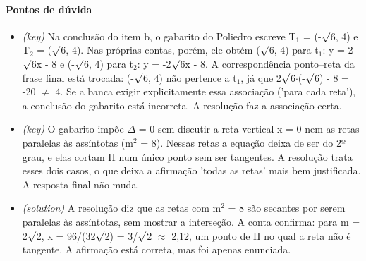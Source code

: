\documentclass{article}%
\begin{document}
\paragraph{Pontos de dúvida}%
\begin{itemize}%
\item%
\textit{(key)} Na conclusão do item b, o gabarito do Poliedro escreve T$_{1}$ = (-$\surd$6, 4) e T$_{2}$ = ($\surd$6, 4). Nas próprias contas, porém, ele obtém ($\surd$6, 4) para t$_{1}$: y = 2$\surd$6x - 8 e (-$\surd$6, 4) para t$_{2}$: y = -2$\surd$6x - 8. A correspondência ponto--reta da frase final está trocada: (-$\surd$6, 4) não pertence a t$_{1}$, já que 2$\surd$6$\cdot$(-$\surd$6) - 8 = -20 $\neq$ 4. Se a banca exigir explicitamente essa associação ('para cada reta'), a conclusão do gabarito está incorreta. A resolução faz a associação certa.%
\item%
\textit{(key)} O gabarito impõe $\Delta$ = 0 sem discutir a reta vertical x = 0 nem as retas paralelas às assíntotas (m$^2$ = 8). Nessas retas a equação deixa de ser do 2º grau, e elas cortam H num único ponto sem ser tangentes. A resolução trata esses dois casos, o que deixa a afirmação 'todas as retas' mais bem justificada. A resposta final não muda.%
\item%
\textit{(solution)} A resolução diz que as retas com m$^2$ = 8 são secantes por serem paralelas às assíntotas, sem mostrar a interseção. A conta confirma: para m = 2$\surd$2, x = 96/(32$\surd$2) = 3/$\surd$2 $\approx$ 2,12, um ponto de H no qual a reta não é tangente. A afirmação está correta, mas foi apenas enunciada.%
\end{itemize}%
\end{document}
